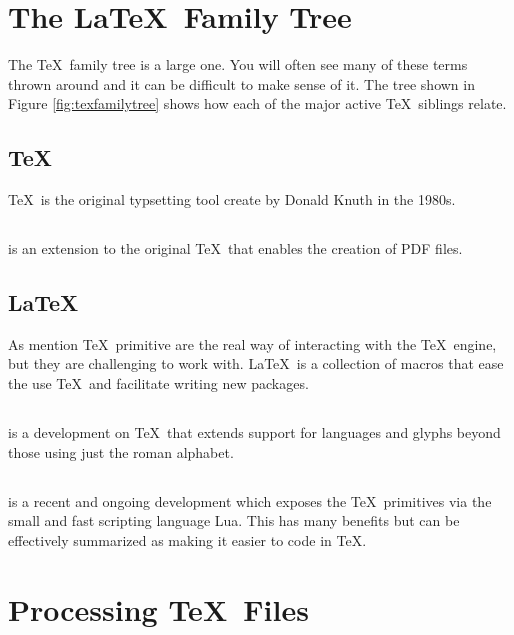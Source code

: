\documentclass[hidelinks]{article}
\begin{document}
    \section{The \LaTeX~Family Tree}
        The \TeX~family tree is a large one. You will often see many of these terms thrown around and it can be difficult to make sense of it.
        The tree shown in Figure \ref{fig:texfamilytree} shows how each of the major active \TeX~siblings relate.
        \subsection{\TeX}
            \TeX~is the original typsetting tool create by Donald Knuth in the 1980s.
        \subsection{}
             is an extension to the original \TeX~that enables the creation of PDF files.
        \subsection{\LaTeX}
            As mention \TeX~primitive are the real way of interacting with the \TeX~engine, but they are challenging to work with.
            \LaTeX~is a collection of macros that ease the use \TeX~and facilitate writing new packages.
        \subsection{}
             is a development on \TeX~that extends support for languages and glyphs beyond those using just the roman alphabet.
        \subsection{}
             is a recent and ongoing development which exposes the \TeX~primitives via the small and fast scripting language Lua.
            This has many benefits but can be effectively summarized as making it easier to code in \TeX.

    \section{Processing \TeX~Files}
\end{document}
